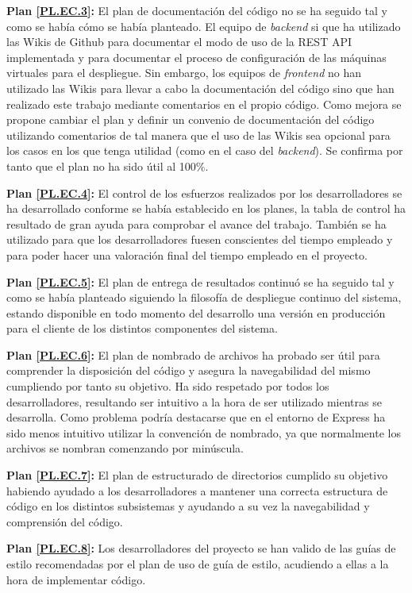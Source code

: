 \documentclass{article}
\begin{document}
\textbf{Plan \ref{PL.EC.3}:}
El plan de documentación del código no se ha seguido tal y como se había cómo se había planteado. El equipo de \textit{backend} si que ha utilizado las Wikis de Github para documentar el modo de uso de la REST API implementada y para documentar el proceso de configuración de las máquinas virtuales para el despliegue. Sin embargo, los equipos de \textit{frontend} no han utilizado las Wikis para llevar a cabo la documentación del código sino que han realizado este trabajo mediante comentarios en el propio código. Como mejora se propone cambiar el plan y definir un convenio de documentación del código utilizando comentarios de tal manera que el uso de las Wikis sea opcional para los casos en los que tenga utilidad (como en el caso del \textit{backend}). Se confirma por tanto que el plan no ha sido útil al 100\%.

\textbf{Plan \ref{PL.EC.4}:}
El control de los esfuerzos realizados por los desarrolladores se ha desarrollado conforme se había establecido en los planes, la tabla de control ha resultado de gran ayuda para comprobar el avance del trabajo. También se ha utilizado para que los desarrolladores fuesen conscientes del tiempo empleado y para poder hacer una valoración final del tiempo empleado en el proyecto.

\textbf{Plan \ref{PL.EC.5}:}
El plan de entrega de resultados continuó se ha seguido tal y como se había planteado siguiendo la filosofía de despliegue continuo del sistema, estando disponible en todo momento del desarrollo una versión en producción para el cliente de los distintos componentes del sistema.

\textbf{Plan \ref{PL.EC.6}:}
El plan de nombrado de archivos ha probado ser útil para comprender la disposición del código y asegura la navegabilidad del mismo cumpliendo por tanto su objetivo. Ha sido respetado por todos los desarrolladores, resultando ser intuitivo a la hora de ser utilizado mientras se desarrolla. Como problema podría destacarse que en el entorno de Express ha sido menos intuitivo utilizar la convención de nombrado, ya que normalmente los archivos se nombran comenzando por minúscula.

\textbf{Plan \ref{PL.EC.7}:}
El plan de estructurado de directorios cumplido su objetivo habiendo ayudado a los desarrolladores a mantener una correcta estructura de código en los distintos subsistemas y ayudando a su vez la navegabilidad y comprensión del código.

\textbf{Plan \ref{PL.EC.8}:}
Los desarrolladores del proyecto se han valido de las guías de estilo recomendadas por el plan de uso de guía de estilo, acudiendo a ellas a la hora de implementar código.
\end{document}
